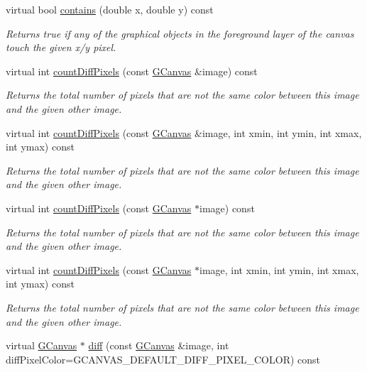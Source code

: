 \begin{DoxyCompactItemize}
virtual bool \mbox{\hyperlink{classsgl_1_1GCanvas_abb6a5d7c03e6eaaae97264c4799ce7c3}{contains}} (double x, double y) const
\begin{DoxyCompactList}\small\item\em Returns true if any of the graphical objects in the foreground layer of the canvas touch the given x/y pixel. \end{DoxyCompactList}\item 
virtual int \mbox{\hyperlink{classsgl_1_1GCanvas_ad3d6147a5e08ed97bb71c7f267ef071b}{count\+Diff\+Pixels}} (const \mbox{\hyperlink{classsgl_1_1GCanvas}{G\+Canvas}} \&image) const
\begin{DoxyCompactList}\small\item\em Returns the total number of pixels that are not the same color between this image and the given other image. \end{DoxyCompactList}\item 
virtual int \mbox{\hyperlink{classsgl_1_1GCanvas_a3ed6edef8ed522bbfc09d8f6005d6d8e}{count\+Diff\+Pixels}} (const \mbox{\hyperlink{classsgl_1_1GCanvas}{G\+Canvas}} \&image, int xmin, int ymin, int xmax, int ymax) const
\begin{DoxyCompactList}\small\item\em Returns the total number of pixels that are not the same color between this image and the given other image. \end{DoxyCompactList}\item 
virtual int \mbox{\hyperlink{classsgl_1_1GCanvas_a443b0f63a197c0f1147b13077f4206e0}{count\+Diff\+Pixels}} (const \mbox{\hyperlink{classsgl_1_1GCanvas}{G\+Canvas}} $\ast$image) const
\begin{DoxyCompactList}\small\item\em Returns the total number of pixels that are not the same color between this image and the given other image. \end{DoxyCompactList}\item 
virtual int \mbox{\hyperlink{classsgl_1_1GCanvas_a77b38a94630c93ecc697fb12a1fb89fd}{count\+Diff\+Pixels}} (const \mbox{\hyperlink{classsgl_1_1GCanvas}{G\+Canvas}} $\ast$image, int xmin, int ymin, int xmax, int ymax) const
\begin{DoxyCompactList}\small\item\em Returns the total number of pixels that are not the same color between this image and the given other image. \end{DoxyCompactList}\item 
virtual \mbox{\hyperlink{classsgl_1_1GCanvas}{G\+Canvas}} $\ast$ \mbox{\hyperlink{classsgl_1_1GCanvas_aa4e74e40eebb70c9616065056de5c4ca}{diff}} (const \mbox{\hyperlink{classsgl_1_1GCanvas}{G\+Canvas}} \&image, int diff\+Pixel\+Color=G\+C\+A\+N\+V\+A\+S\+\_\+\+D\+E\+F\+A\+U\+L\+T\+\_\+\+D\+I\+F\+F\+\_\+\+P\+I\+X\+E\+L\+\_\+\+C\+O\+L\+OR) const

\end{DoxyCompactItemize}
